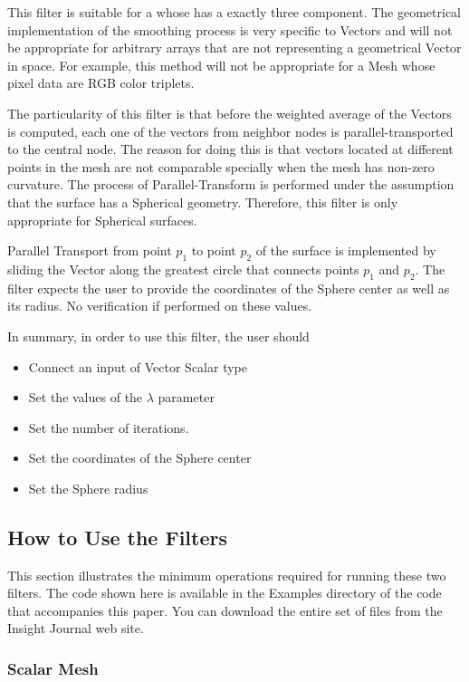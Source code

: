 \documentclass{InsightArticle}
\begin{document}
This filter is suitable for a  whose  has a
exactly three component. The geometrical implementation of the smoothing
process is very specific to Vectors and will not be appropriate for arbitrary
arrays that are not representing a geometrical Vector in space. For example,
this method will not be appropriate for a Mesh whose pixel data are RGB color
triplets.

The particularity of this filter is that before the weighted average of the
Vectors is computed, each one of the vectors from neighbor nodes is
parallel-transported to the central node. The reason for doing this is that
vectors located at different points in the mesh are not comparable specially
when the mesh has non-zero curvature. The process of Parallel-Transform is
performed under the assumption that the surface has a Spherical geometry.
Therefore, this filter is only appropriate for Spherical surfaces.

Parallel Transport from point $p_1$ to point $p_2$ of the surface is
implemented by sliding the Vector along the greatest circle that connects
points $p_1$ and $p_2$. The filter expects the user to provide the coordinates
of the Sphere center as well as its radius. No verification if performed on
these values.

In summary, in order to use this filter, the user should 

\begin{itemize}
\item Connect an input  of Vector Scalar type
\item Set the values of the $\lambda$ parameter
\item Set the number of iterations.
\item Set the coordinates of the Sphere center
\item Set the Sphere radius
\end{itemize}


\subsection{How to Use the Filters}

This section illustrates the minimum operations required for running these two
filters. The code shown here is available in the Examples directory of the code
that accompanies this paper. You can download the entire set of files from the
Insight Journal web site.

\subsubsection{Scalar Mesh}
\end{document}
